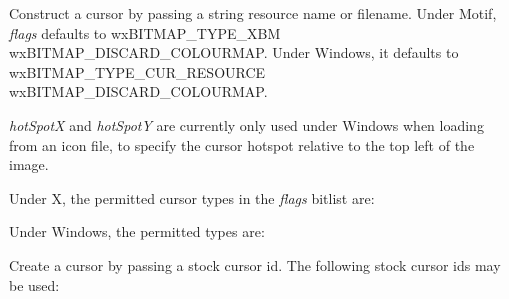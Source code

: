 Construct a cursor by passing a string resource name or filename.
Under Motif, {\it flags} defaults to wxBITMAP\_TYPE\_XBM \pipe wxBITMAP\_DISCARD\_COLOURMAP. Under Windows,
it defaults to  wxBITMAP\_TYPE\_CUR\_RESOURCE \pipe wxBITMAP\_DISCARD\_COLOURMAP.

{\it hotSpotX} and {\it hotSpotY} are currently only used under Windows when loading from an
icon file, to specify the cursor hotspot relative to the top left of the image.

Under X, the permitted cursor types in the {\it flags} bitlist are:

\begin{twocollist}\itemsep=0pt
\end{twocollist}

Under Windows, the permitted types are:

\begin{twocollist}\itemsep=0pt
\end{twocollist}


Create a cursor by passing a stock cursor id.
The following stock cursor ids may be used:

